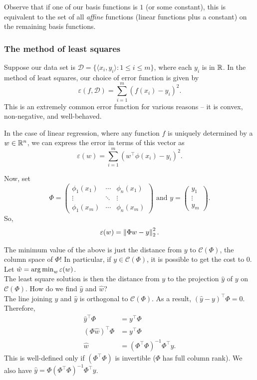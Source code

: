 \documentclass{article}
\begin{document}
		Observe that if one of our basis functions is $1$ (or some constant), this is equivalent to the set of all \emph{affine} functions (linear functions plus a constant) on the remaining basis functions.


		\subsubsection{The method of least squares}

			\label{subsubsec: the method of least squares}

			Suppose our data set is $\mathcal{D} = \{\langle x_i,y_i\rangle : 1 \le i \le m\}$, where each $y_i$ is in $\mathbb{R}$. In the method of least squares, our choice of error function is given by
			\[ \varepsilon(f,\mathcal{D}) = \sum_{i=1}^m (f(x_i) - y_i)^2. \]
			This is an extremely common error function for various reasons -- it is convex, non-negative, and well-behaved.

			In the case of linear regression, where any function $f$ is uniquely determined by a $w\in \mathbb{R}^n$, we can express the error in terms of this vector as
			\[ \varepsilon(w) = \sum_{i=1}^m (w^\top \phi(x_i) - y_i)^2. \]

			Now, set
			\[
				\Phi =
				\begin{pmatrix}
					\phi_1(x_1) & \cdots & \phi_n(x_1) \\
					\vdots & \ddots & \vdots \\
					\phi_1(x_m) & \cdots & \phi_n(x_m)
				\end{pmatrix}
				\text{ and }
				y =
				\begin{pmatrix}
					y_1 \\
					\vdots \\
					y_m
				\end{pmatrix}.
			\]
			So,
			\[ \varepsilon(w) = \left\lVert\Phi w - y\right\rVert_2^2. \]

			The minimum value of the above is just the distance from $y$ to $\mathcal{C}(\Phi)$, the column space of $\Phi$! In particular, if $y\in\mathcal{C}(\Phi)$, it is possible to get the cost to $0$. Let $\hat{w} = \operatorname*{arg\,min}_{w} \varepsilon(w)$.\\
			The least square solution is then the distance from $y$ to the projection $\hat{y}$ of $y$ on $\mathcal{C}(\Phi)$. How do we find $\hat{y}$ and $\hat{w}$?\\
			The line joining $y$ and $\hat{y}$ is orthogonal to $\mathcal{C}(\Phi)$. As a result, $(\hat{y} - y)^\top \Phi = 0$. Therefore,
			\begin{align*}
				\hat{y}^\top \Phi &= y^\top \Phi \\
				(\Phi \hat{w})^\top \Phi &= y^\top \Phi \\
				\hat{w} &= (\Phi^\top \Phi)^{-1} \Phi^\top y.
			\end{align*}
			This is well-defined only if $(\Phi^\top \Phi)$ is invertible ($\Phi$ has full column rank). We also have $\hat{y} = \Phi (\Phi^\top \Phi)^{-1} \Phi^\top y$.
\end{document}
